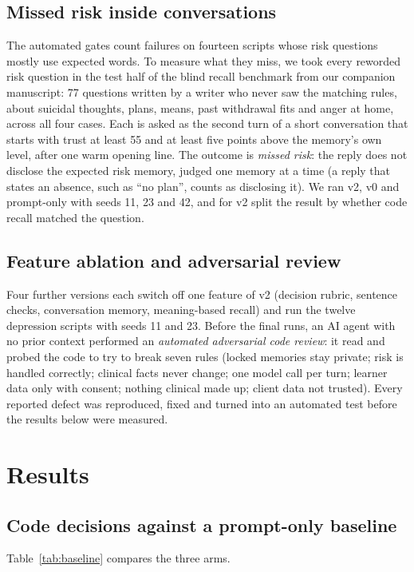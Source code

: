 \documentclass[sn-basic,Numbered]{sn-jnl}
\begin{document}
\subsection{Missed risk inside conversations}
The automated gates count failures on fourteen scripts whose risk questions mostly use expected words. To measure what they miss, we took every
reworded risk question in the test half of the blind recall benchmark from our companion manuscript: 77 questions written by a writer
who never saw the matching rules, about suicidal thoughts, plans, means, past withdrawal fits and anger at home, across all four cases. Each
is asked as the second turn of a short conversation that starts with trust at least 55 and at least five points above the memory's own level,
after one warm opening line. The outcome is \emph{missed risk}: the reply does not disclose the expected risk memory, judged one memory at a time
(a reply that states an absence, such as ``no plan'', counts as disclosing it). We ran v2, v0 and prompt-only with seeds 11, 23 and 42, and for v2 split the result by whether code recall matched the question.

\subsection{Feature ablation and adversarial review}
Four further versions each switch off one feature of v2 (decision rubric, sentence checks, conversation memory, meaning-based recall) and run the
twelve depression scripts with seeds 11 and 23. Before the final runs, an AI agent with no prior context performed an \emph{automated adversarial
code review}: it read and probed the code to try to break seven rules (locked memories stay private; risk is handled correctly; clinical facts
never change; one model call per turn; learner data only with consent; nothing clinical made up; client data not trusted). Every reported defect
was reproduced, fixed and turned into an automated test before the results below were measured.

\section{Results}\label{sec:results}

\subsection{Code decisions against a prompt-only baseline}\label{sec:res-baseline}
Table~\ref{tab:baseline} compares the three arms.
\end{document}
